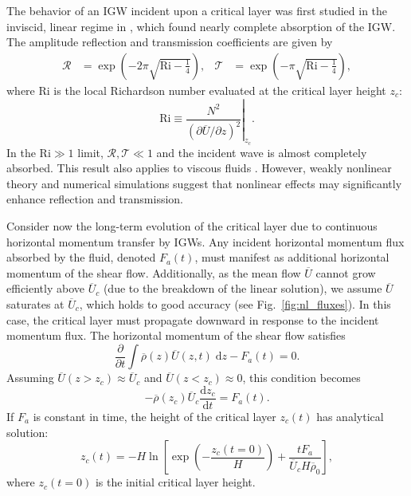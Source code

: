 \documentclass[
        fleqn,
        usenatbib,
    ]{mnras}
\newcommand*{\rd}[2]{\frac{\mathrm{d}#1}{\mathrm{d}#2}}
\newcommand*{\pd}[2]{\frac{\partial#1}{\partial#2}}
\newcommand*{\pdil}[2]{\partial#1/\partial#2}
\newcommand*{\at}[1]{\left.#1\right|}
\newcommand*{\p}[1]{\left(#1\right)}
\newcommand*{\s}[1]{\left[#1\right]}
\begin{document}
The behavior of an IGW incident upon a critical layer was first studied in the
inviscid, linear regime in \citet{booker_bretherton}, which found nearly
complete absorption of the IGW\@. The amplitude
reflection and transmission coefficients are given by
\begin{align}
    \mathcal{R} &= \exp\p{-2\pi \sqrt{\mathrm{Ri} - \frac{1}{4}}}, &
    \mathcal{T} &= \exp\p{-\pi \sqrt{\mathrm{Ri} - \frac{1}{4}}},
        \label{eq:crit_coeffs}
\end{align}
where $\mathrm{Ri}$ is the local Richardson number evaluated at the critical
layer height $z_c$:
\begin{equation}
    \mathrm{Ri} \equiv \at{\frac{N^2}{\p{\pdil{\overline{U}}{z}}^2}}_{z_c}.
        \label{eq:ri_def}
\end{equation}
In the $\mathrm{Ri} \gg 1$ limit, $\mathcal{R}, \mathcal{T} \ll 1$ and the
incident wave is almost completely absorbed. This result also applies to viscous
fluids \citep{hazel}. However, weakly nonlinear theory \citep{brown_stewartson}
and numerical simulations \citep{winters1994} suggest that nonlinear effects may
significantly enhance reflection and transmission.

Consider now the long-term evolution of the critical layer due to continuous
horizontal momentum transfer by IGWs. Any incident horizontal
momentum flux absorbed by the fluid, denoted $F_a(t)$, must manifest as
additional horizontal momentum of the shear flow.
Additionally, as the mean flow $\overline{U}$ cannot grow
efficiently above $\overline{U}_c$ (due to the breakdown of the linear
solution), we assume $\overline{U}$ saturates at $\overline{U}_c$, which holds
to good accuracy (see Fig.~\ref{fig:nl_fluxes}). In this case, the critical
layer must propagate downward in response to the incident momentum flux. The
horizontal momentum of the shear flow satisfies
\begin{equation}
    \pd{}{t}\int\limits \overline{\rho}(z) \overline{U}(z, t)\;\mathrm{d}z
        - F_a(t) = 0.
\end{equation}
Assuming $\overline{U}(z > z_c) \approx \overline{U}_c$ and $\overline{U}(z <
z_c) \approx 0$, this condition becomes
\begin{equation}
    -\overline{\rho}(z_c) \overline{U}_c\rd{z_c}{t} = F_a(t).\label{eq:zc_anal}
\end{equation}
If $F_a$ is constant in time, the height of the critical layer $z_c(t)$ has
analytical solution:
\begin{equation}
    z_c(t) = -H\ln \s{\exp\p{-\frac{z_c(t = 0)}{H}} +
        \frac{tF_a}{\overline{U}_c H\overline{\rho}_0}},\label{eq:zc_sol}
\end{equation}
where $z_c(t = 0)$ is the initial critical layer height.
\end{document}
